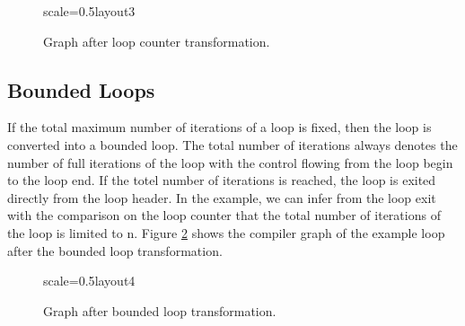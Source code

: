 \documentclass[twocolumn]{svjour3}
\begin{document}
\begin{figure}[h]
  \label{fig:loop3}
  \centering
\begin{digraphenv}{scale=0.5}{layout3}
\end{digraphenv}
  \caption{Graph after loop counter transformation.}
\end{figure}

\subsection{Bounded Loops}

If the total maximum number of iterations of a loop is fixed, then the loop is converted into a bounded loop.
The total number of iterations always denotes the number of full iterations of the loop with the control flowing from the loop begin to the loop end.
If the totel number of iterations is reached, the loop is exited directly from the loop header.
In the example, we can infer from the loop exit with the comparison on the loop counter that the total number of iterations of the loop is limited to n.
Figure \ref{fig:loop4} shows the compiler graph of the example loop after the bounded loop transformation.

\begin{figure}[h]
  \label{fig:loop4}
  \centering
\begin{digraphenv}{scale=0.5}{layout4}
\end{digraphenv}
  \caption{Graph after bounded loop transformation.}
\end{figure}
\end{document}
